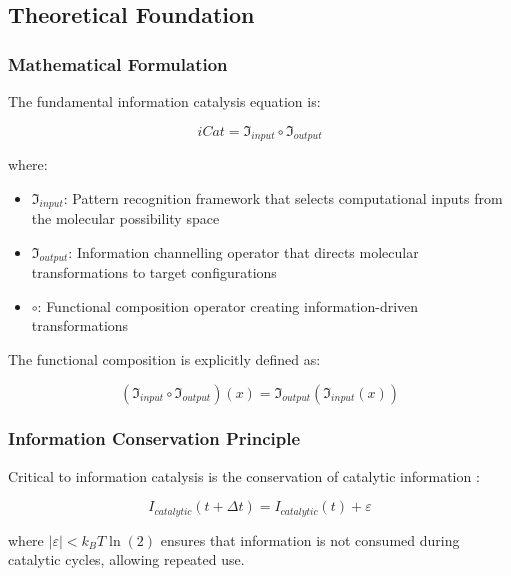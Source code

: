 \documentclass[12pt,a4paper]{article}
\begin{document}
\subsection{Theoretical Foundation}

\subsubsection{Mathematical Formulation}

The fundamental information catalysis equation is:

\begin{equation}
iCat = \mathfrak{I}_{input} \circ \mathfrak{I}_{output}
\end{equation}

where:
\begin{itemize}
\item $\mathfrak{I}_{input}$: Pattern recognition framework that selects computational inputs from the molecular possibility space
\item $\mathfrak{I}_{output}$: Information channelling operator that directs molecular transformations to target configurations  
\item $\circ$: Functional composition operator creating information-driven transformations
\end{itemize}

The functional composition is explicitly defined as:

\begin{equation}
(\mathfrak{I}_{input} \circ \mathfrak{I}_{output})(x) = \mathfrak{I}_{output}(\mathfrak{I}_{input}(x))
\end{equation}

\subsubsection{Information Conservation Principle}

Critical to information catalysis is the conservation of catalytic information \cite{bennett1982thermodynamics}:

\begin{equation}
I_{catalytic}(t + \Delta t) = I_{catalytic}(t) + \varepsilon
\end{equation}

where $|\varepsilon| < k_B T \ln(2)$ ensures that information is not consumed during catalytic cycles, allowing repeated use.
\end{document}
